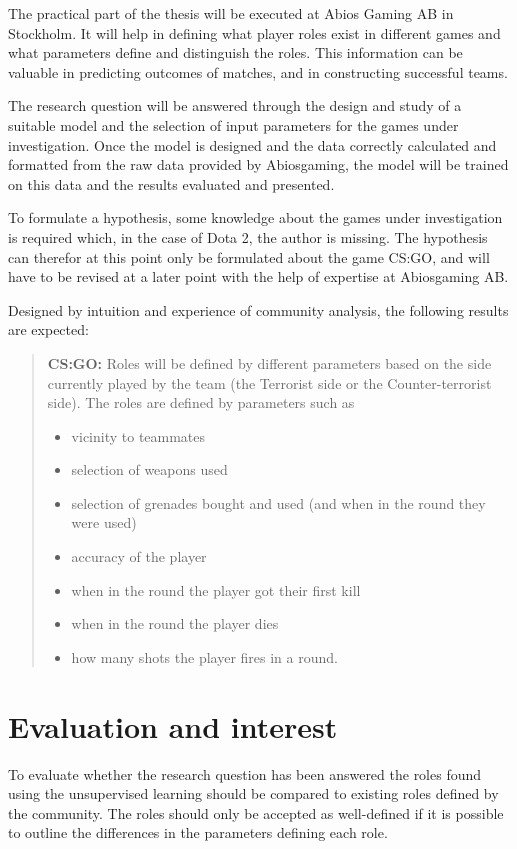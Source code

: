 \documentclass{article}
\begin{document}
The practical part of the thesis will be executed at Abios Gaming AB in Stockholm. It will help in defining what player roles exist in different games and what parameters define and distinguish the roles. This information can be valuable in predicting outcomes of matches, and in constructing successful teams.

The research question will be answered through the design and study of a suitable model and the selection of input parameters for the games under investigation. Once the model is designed and the data correctly calculated and formatted from the raw data provided by Abiosgaming, the model will be trained on this data and the results evaluated and presented.

To formulate a hypothesis, some knowledge about the games under investigation is required which, in the case of Dota 2, the author is missing. The hypothesis can therefor at this point only be formulated about the game CS:GO, and will have to be revised at a later point with the help of expertise at Abiosgaming AB.

Designed by intuition and experience of community analysis, the following results are expected:
\begin{quote}
    {\bf CS:GO:} Roles will be defined by different parameters based on the side currently played by the team (the Terrorist side or the Counter-terrorist side). The roles are defined by parameters such as
    \begin{itemize}
        \item vicinity to teammates
        \item selection of weapons used
        \item selection of grenades bought and used (and when in the round they were used)
        \item accuracy of the player
        \item when in the round the player got their first kill
        \item when in the round the player dies
        \item how many shots the player fires in a round.
    \end{itemize}
\end{quote}

\section{Evaluation and interest}
To evaluate whether the research question has been answered the roles found using the unsupervised learning should be compared to existing roles defined by the community. The roles should only be accepted as well-defined if it is possible to outline the differences in the parameters defining each role.
\end{document}

